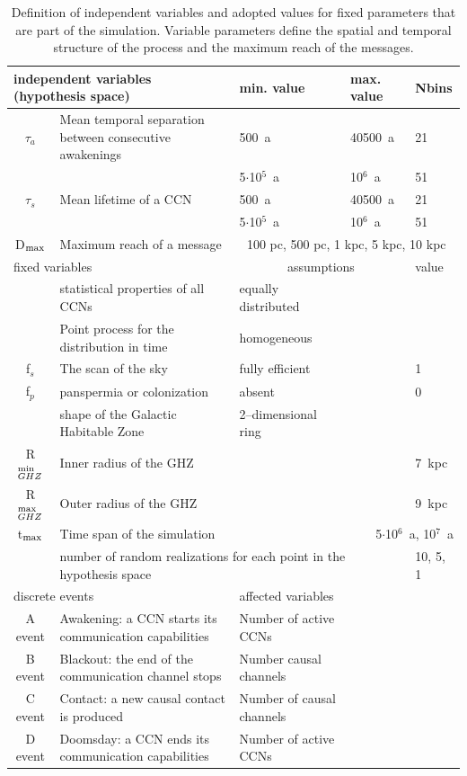 \documentclass[crop]{CSLB}
\newcommand{\ceti}{CCN}
\newcommand{\cetis}{CCNs}
\begin{document}
 \setlength{\tabcolsep}{10pt}
\begin{table}
\centering
\begin{tabular}{cllll}
\hline
   \multicolumn{2}{l}{independent variables (hypothesis space)}
   &min. value&max. value&Nbins\\
\hline
   $\tau_{a}$ & Mean temporal separation between consecutive awakenings 
	      & 500~a & 40500~a & 21\\ 
	    & & 5$\cdot$10$^5$~a & 10$^6$~a & 51\\ 
   $\tau_{s}$ & Mean lifetime of a \ceti{}
	      & 500~a & 40500~a & 21\\ 
	    & & 5$\cdot$10$^5$~a & 10$^6$~a & 51\\ 
	D$_{\rm max}$ & Maximum reach of a message  & \multicolumn{3}{c}{100 pc, 500 pc, 1 kpc, 5 kpc, 10 kpc} \\
\hline
   \multicolumn{2}{l}{fixed variables} & \multicolumn{2}{c}{assumptions} &value \\
\hline
   & statistical properties of all \cetis{} &equally distributed&&\\
   & Point process for the distribution in time & homogeneous &&\\
   f$_s$ & The scan of the sky & fully efficient&&1\\
   f$_p$ & panspermia or colonization &absent&&0\\
   & shape of the Galactic Habitable Zone & 2--dimensional ring &&\\
	R$_{GHZ}^{\rm min}$   & Inner radius of the GHZ  & \citet{lineweaver_galactic_2004} & & 7~kpc\\
   R$_{GHZ}^{\rm max}$   & Outer radius of the GHZ       & \citet{lineweaver_galactic_2004} & & 9~kpc\\
	t$_{\rm max}$ & Time span of the simulation  & & \multicolumn{2}{r}{5$\cdot$10$^6$~a, 10$^7$~a} \\
    & \multicolumn{3}{l}{number of random realizations for each point in the hypothesis space} & 10, 5, 1 \\
\hline
   \multicolumn{2}{l}{discrete events} &
   \multicolumn{3}{l}{affected variables}\\
\hline
   A event & Awakening: a \ceti{} starts its communication
   capabilities &Number of active \cetis{}\\
   B event & Blackout: the end of the communication channel stops
   &Number causal channels\\
   C event & Contact: a new causal contact is produced &Number of causal channels\\
   D event & Doomsday: a \ceti{} ends its communication capabilities&Number of active \cetis{}\\
\hline

\hline
\end{tabular}
\caption{Definition of independent variables and adopted values for 
   fixed parameters 
   that are part of the simulation.  Variable parameters define the
   spatial and temporal structure
   of the process and the maximum reach of the messages.}
\label{T_simu_hypotheses}
\end{table}
 
\end{document}
